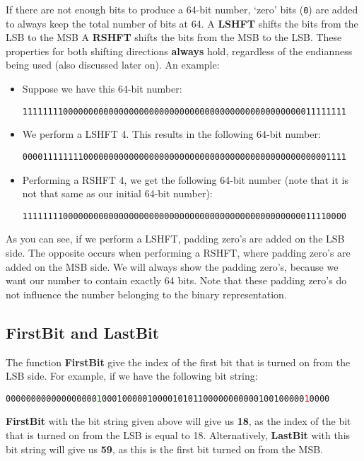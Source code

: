 If there are not enough bits to produce a 64-bit number, `zero' bits (\texttt{0}) are added to always keep the total number of bits at 64.
A \textbf{LSHFT} shifts the bits from the LSB to the MSB
A \textbf{RSHFT} shifts the bits from the MSB to the LSB.
These properties for both shifting directions \textbf{always} hold, regardless of the endianness being used (also discussed later on).
An example:
%
\begin{itemize}
	\item Suppose we have this 64-bit number:
	\begin{center}
		\texttt{1111111100000000000000000000000000000000000000000000000011111111}
	\end{center}
	\item We perform a LSHFT 4. This results in the following 64-bit number:
	\begin{center}
		\texttt{0000111111110000000000000000000000000000000000000000000000001111}
	\end{center}
	\item Performing a RSHFT 4, we get the following 64-bit number (note that it is not that same as our initial 64-bit number):
	\begin{center}
		\begin{center}
			\texttt{1111111100000000000000000000000000000000000000000000000011110000}
		\end{center}
	\end{center}
\end{itemize}
%
As you can see, if we perform a LSHFT, padding zero's are added on the LSB side.
The opposite occurs when performing a RSHFT, where padding zero's are added on the MSB side.
We will always show the padding zero's, because we want our number to contain exactly 64 bits.
Note that these padding zero's do not influence the number belonging to the binary representation.

\subsection{FirstBit and LastBit}
The function \textbf{FirstBit} give the index of the first bit that is turned on from the LSB side.
For example, if we have the following bit string:
%
\begin{center}
	\texttt{000000000000000000\textcolor{green}{1}0001000001000010101100000000000100100000\textcolor{red}{1}0000}
\end{center}
%
\textbf{FirstBit} with the bit string given above will give us \textbf{18}, as the index of the bit that is turned on from the LSB is equal to 18.
Alternatively, \textbf{LastBit} with this bit string will give us \textbf{59}, as this is the first bit turned on from the MSB.

